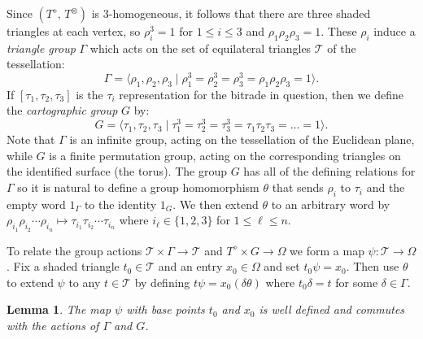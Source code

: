 \documentclass[amstags,fleqn,reqno]{article}
\theoremstyle{plain}
\newtheorem{lemma}[theorem]{Lemma}
\theoremstyle{definition}
\renewcommand\leq{\leqslant}
\newcommand{\darts}{\Omega\xspace}
\newcommand{\settriangles}{\mathcal{T}}
\newcommand{\triToT}{\psi}
\newcommand{\opa}{\diamond}
\newcommand{\opb}{\otimes}
\begin{document}
Since $(T^{\opa},\, T^{\opb})$ is $3$-homogeneous, it follows that there
are three shaded triangles at each vertex, so
$\rho_i^3 = 1$ for $1 \leq i \leq 3$ and
$\rho_1 \rho_2 \rho_3 = 1$. These $\rho_i$ induce a 
{\em triangle group\/} $\Gamma$ which acts on the
set of equilateral triangles $\settriangles$ of the tessellation:
\begin{equation}\label{eqnTessellationGamma}
\Gamma = \langle \rho_1, \rho_2, \rho_3 \mid \rho_1^3 = \rho_2^3 = \rho_3^3 
= \rho_1 \rho_2 \rho_3 = 1 \rangle.
\end{equation}
If $[\tau_1, \tau_2, \tau_3]$ is the $\tau_i$ representation for the
bitrade in question, then we define the {\em cartographic group} $G$ by:
\begin{equation}\label{eqnTessellationG}
G = \langle \tau_1, \tau_2, \tau_3 \mid \tau_1^3 = \tau_2^3 = \tau_3^3 
= \tau_1 \tau_2 \tau_3 = \ldots = 1 \rangle.
\end{equation}
Note that $\Gamma$ is an infinite group, acting on the tessellation of
the Euclidean plane, while 
$G$ is a finite permutation group, acting on the corresponding
triangles on the identified surface (the torus). 
The group $G$ has all of the defining relations for $\Gamma$ so it is
natural to define a group homomorphism $\theta$ that sends $\rho_i$ to $\tau_i$ and the empty word 
$1_{\Gamma}$ to the identity $1_G$. We then extend
$\theta$ to an arbitrary word by
$\rho_{i_1} \rho_{i_2} \cdots \rho_{i_n} \mapsto 
\tau_{i_1} \tau_{i_2} \cdots \tau_{i_n}$
where $i_{\ell} \in \{ 1,2,3 \}$ for $1 \leq \ell \leq n$.

To relate the group actions 
$\settriangles \times \Gamma \rightarrow \settriangles$
and 
$T^{\opa} \times G \rightarrow \darts$
we form a map $\triToT \colon \settriangles \rightarrow \darts$.
Fix a shaded triangle $t_0 \in \settriangles$ and 
an entry $x_0 \in \darts$ and set $t_0 \triToT = x_0$. Then use $\theta$
to extend $\triToT$ to any $t \in \settriangles$ by
defining
$t\triToT = x_0 (\delta \theta)$ where $t_0 \delta = t$ for some $\delta \in \Gamma$.


\begin{lemma}\label{3homCommutes}
The map $\triToT$ with base points $t_0$ and $x_0$ is well defined and
commutes with the actions of $\Gamma$ and $G$.
\end{lemma}
\end{document}
